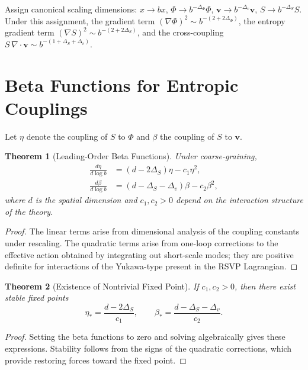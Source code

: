 \documentclass[12pt,a4paper,openany]{book}
\theoremstyle{plain}
\newtheorem{theorem}{Theorem}[chapter]
\theoremstyle{definition}
\theoremstyle{remark}
\begin{document}
Assign canonical scaling dimensions: $x \to bx$, $\Phi \to b^{-\Delta_\Phi}\Phi$, $\mathbf{v} \to b^{-\Delta_v}\mathbf{v}$, $S \to b^{-\Delta_S}S$. Under this assignment, the gradient term $(\nabla\Phi)^2 \sim b^{-(2+2\Delta_\Phi)}$, the entropy gradient term $(\nabla S)^2 \sim b^{-(2+2\Delta_S)}$, and the cross-coupling $S\,\nabla\cdot\mathbf{v} \sim b^{-(1+\Delta_S+\Delta_v)}$.

\section{Beta Functions for Entropic Couplings}

Let $\eta$ denote the coupling of $S$ to $\Phi$ and $\beta$ the coupling of $S$ to $\mathbf{v}$.

\begin{theorem}[Leading-Order Beta Functions]
\label{thm:beta_entropy}
Under coarse-graining,
\begin{align*}
\frac{d\eta}{d\log b} &= (d - 2\Delta_S)\eta - c_1\eta^2, \\
\frac{d\beta}{d\log b} &= (d - \Delta_S - \Delta_v)\beta - c_2\beta^2,
\end{align*}
where $d$ is the spatial dimension and $c_1, c_2 > 0$ depend on the interaction structure of the theory.
\end{theorem}

\begin{proof}
The linear terms arise from dimensional analysis of the coupling constants under rescaling. The quadratic terms arise from one-loop corrections to the effective action obtained by integrating out short-scale modes; they are positive definite for interactions of the Yukawa-type present in the RSVP Lagrangian.
\end{proof}

\begin{theorem}[Existence of Nontrivial Fixed Point]
\label{thm:fixed_point_entropy}
If $c_1, c_2 > 0$, then there exist stable fixed points
\[
\eta_* = \frac{d - 2\Delta_S}{c_1}, \qquad \beta_* = \frac{d - \Delta_S - \Delta_v}{c_2}.
\]
\end{theorem}

\begin{proof}
Setting the beta functions to zero and solving algebraically gives these expressions. Stability follows from the signs of the quadratic corrections, which provide restoring forces toward the fixed point.
\end{proof}
\end{document}
